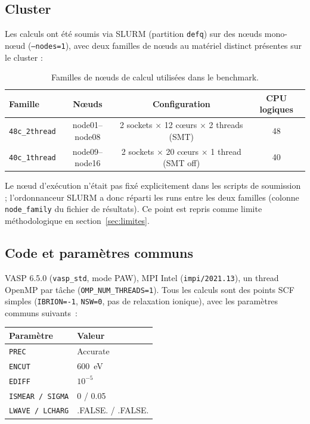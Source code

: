 \documentclass[11pt,a4paper]{article}
\begin{document}
\subsection{Cluster}

Les calculs ont été soumis via SLURM (partition \texttt{defq}) sur des nœuds mono-nœud
(\texttt{--nodes=1}), avec deux familles de nœuds au matériel distinct présentes sur le cluster :

\begin{table}[h]
\centering
\begin{tabular}{lccc}
\toprule
Famille & Nœuds & Configuration & CPU logiques \\
\midrule
\texttt{48c\_2thread} & node01--node08 & 2 sockets $\times$ 12 c\oe urs $\times$ 2 threads (SMT) & 48 \\
\texttt{40c\_1thread} & node09--node16 & 2 sockets $\times$ 20 c\oe urs $\times$ 1 thread (SMT off) & 40 \\
\bottomrule
\end{tabular}
\caption{Familles de nœuds de calcul utilisées dans le benchmark.}
\end{table}

Le nœud d'exécution n'était pas fixé explicitement dans les scripts de soumission ; l'ordonnanceur
SLURM a donc réparti les runs entre les deux familles (colonne \texttt{node\_family} du fichier de
résultats). Ce point est repris comme limite méthodologique en section~\ref{sec:limites}.

\subsection{Code et paramètres communs}

VASP 6.5.0 (\texttt{vasp\_std}, mode PAW), MPI Intel (\texttt{impi/2021.13}), un thread OpenMP par
tâche (\texttt{OMP\_NUM\_THREADS=1}). Tous les calculs sont des points SCF simples
(\texttt{IBRION=-1}, \texttt{NSW=0}, pas de relaxation ionique), avec les paramètres communs
suivants~:

\begin{center}
\begin{tabular}{ll}
\toprule
Paramètre & Valeur \\
\midrule
\texttt{PREC} & Accurate \\
\texttt{ENCUT} & 600~eV \\
\texttt{EDIFF} & $10^{-5}$ \\
\texttt{ISMEAR / SIGMA} & 0 / 0.05 \\
\texttt{LWAVE / LCHARG} & .FALSE. / .FALSE. \\
\bottomrule
\end{tabular}
\end{center}
\end{document}
